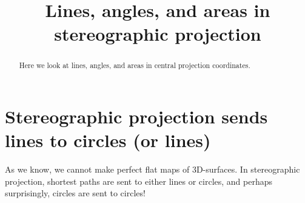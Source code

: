 \documentclass{ximera}
\title{Lines, angles, and areas in stereographic projection}
\begin{document}
\begin{abstract}
Here we look at lines, angles, and areas in central
projection coordinates.
\end{abstract}
\maketitle


\section{Stereographic projection sends lines to circles (or lines)}

As we know, we cannot make perfect flat maps of 3D-surfaces. In
stereographic projection, shortest paths are sent to either lines or
circles, and perhaps surprisingly, circles are sent to circles!
\end{document}

